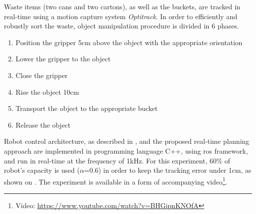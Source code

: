 Waste items (two cans and two cartons), as well as the buckets, are tracked in real-time using a motion capture system \textit{Optitrack}. In order to efficiently and robustly sort the waste, object manipulation procedure is divided in 6 phases.
\begin{enumerate}
    \item Position the gripper 5cm above the object with the appropriate orientation
    \item Lower the gripper to the object
    \item Close the gripper
    \item Rise the object 10cm
    \item Transport the object to the appropriate bucket
    \item Release the object
\end{enumerate}

Robot control architecture, as described in , and the proposed real-time planning approach are implemented in 
programming language C++, using \gls{ros} framework, and run in real-time at the frequency of 1kHz. For this experiment, 60\% of robot's capacity is used ($\alpha$=0.6) in order to keep the tracking error under 1cm, as shown on .
The experiment is available in a form of accompanying video\footnote{Video: \url{https://www.youtube.com/watch?v=BHGipnKNOfA}}.


